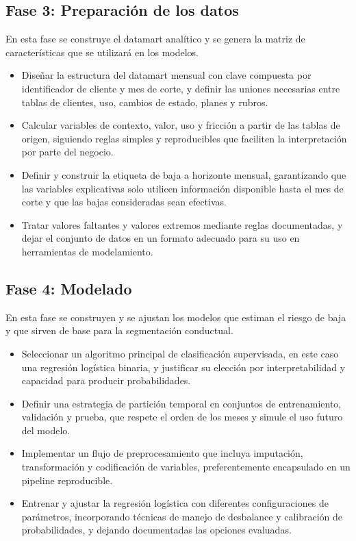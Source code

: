 \subsection{Fase 3: Preparación de los datos}

En esta fase se construye el datamart analítico y se genera la matriz de características que se utilizará en los modelos.

\begin{itemize}
    \item Diseñar la estructura del datamart mensual con clave compuesta por identificador de cliente y mes de corte, y definir las uniones necesarias entre tablas de clientes, uso, cambios de estado, planes y rubros.
    \item Calcular variables de contexto, valor, uso y fricción a partir de las tablas de origen, siguiendo reglas simples y reproducibles que faciliten la interpretación por parte del negocio.
    \item Definir y construir la etiqueta de baja a horizonte mensual, garantizando que las variables explicativas solo utilicen información disponible hasta el mes de corte y que las bajas consideradas sean efectivas.
    \item Tratar valores faltantes y valores extremos mediante reglas documentadas, y dejar el conjunto de datos en un formato adecuado para su uso en herramientas de modelamiento.
\end{itemize}

\subsection{Fase 4: Modelado}

En esta fase se construyen y se ajustan los modelos que estiman el riesgo de baja y que sirven de base para la segmentación conductual.

\begin{itemize}
    \item Seleccionar un algoritmo principal de clasificación supervisada, en este caso una regresión logística binaria, y justificar su elección por interpretabilidad y capacidad para producir probabilidades.
    \item Definir una estrategia de partición temporal en conjuntos de entrenamiento, validación y prueba, que respete el orden de los meses y simule el uso futuro del modelo.
    \item Implementar un flujo de preprocesamiento que incluya imputación, transformación y codificación de variables, preferentemente encapsulado en un pipeline reproducible.
    \item Entrenar y ajustar la regresión logística con diferentes configuraciones de parámetros, incorporando técnicas de manejo de desbalance y calibración de probabilidades, y dejando documentadas las opciones evaluadas.
\end{itemize}

